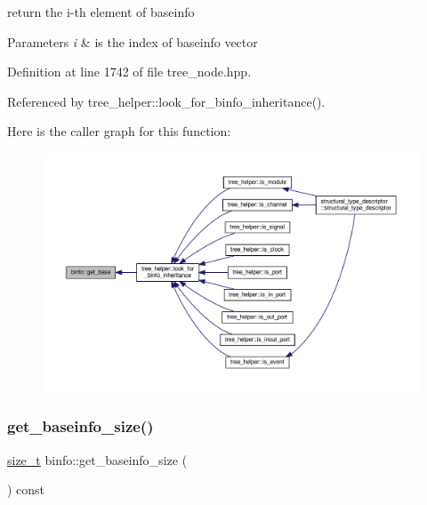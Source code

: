 return the i-\/th element of baseinfo 


\begin{DoxyParams}{Parameters}
{\em i} & is the index of baseinfo vector \\
\hline
\end{DoxyParams}


Definition at line 1742 of file tree\+\_\+node.\+hpp.



Referenced by tree\+\_\+helper\+::look\+\_\+for\+\_\+binfo\+\_\+inheritance().

Here is the caller graph for this function\+:
\nopagebreak
\begin{figure}[H]
\begin{center}
\leavevmode
\includegraphics[width=350pt]{d2/db5/structbinfo_a373cb009bfbb00aac48ceb5c03fb72f1_icgraph}
\end{center}
\end{figure}
\mbox{\label{structbinfo_ac48ab2cc024529097997704729acccb3}} 
\subsubsection{\texorpdfstring{get\+\_\+baseinfo\+\_\+size()}{get\_baseinfo\_size()}}
{\footnotesize\ttfamily \hyperlink{tutorial__fpt__2017_2intro_2sixth_2test_8c_a7c94ea6f8948649f8d181ae55911eeaf}{size\+\_\+t} binfo\+::get\+\_\+baseinfo\+\_\+size (\begin{DoxyParamCaption}{ }\end{DoxyParamCaption}) const\hspace{0.3cm}{\ttfamily [inline]}}



